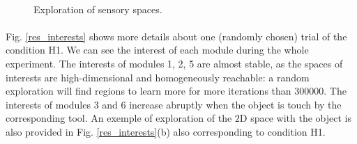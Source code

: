 \documentclass[10pt,letterpaper]{article}
\begin{document}
	\begin{figure}[ht]
		\centering
		\\
		\caption{Exploration of sensory spaces.}
		\label{res_explo}
	\end{figure}


	\paragraph{}
	Fig. \ref{res_interests} shows more details about one (randomly chosen) trial of the condition H1. 
	We can see the interest of each module during the whole experiment.
	The interests of modules 1, 2, 5 are almost stable, as the spaces of interests are high-dimensional and homogeneously reachable: a random exploration will find regions to learn more for more iterations than $300000$.
	The interests of modules 3 and 6 increase abruptly when the object is touch by the corresponding tool.
	An exemple of exploration of the $2$D space with the object is also provided in Fig. \ref{res_interests}(b) also corresponding to condition H1.
	
\end{document}
